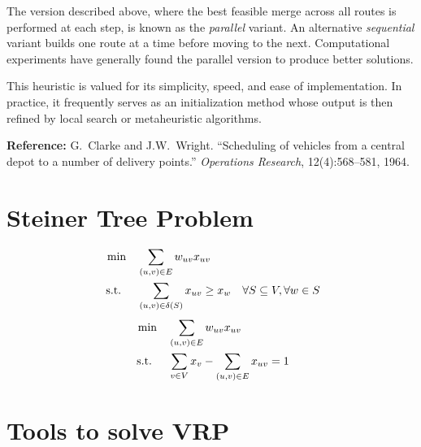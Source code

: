 The version described above, where the best feasible merge across all routes is performed at each step, is known as the \emph{parallel} variant.  An alternative \emph{sequential} variant builds one route at a time before moving to the next.  Computational experiments have generally found the parallel version to produce better solutions.

This heuristic is valued for its simplicity, speed, and ease of implementation.  In practice, it frequently serves as an initialization method whose output is then refined by local search or metaheuristic algorithms.

\medskip
\noindent\textbf{Reference:}  G.~Clarke and J.W.~Wright. ``Scheduling of vehicles from a central depot to a number of delivery points.'' \textit{Operations Research}, 12(4):568--581, 1964.

\section{Steiner Tree Problem}
%
%
\begin{align*}
\min \quad & \sum_{(u,v) \in E} w_{uv} x_{uv}\\
\mbox{ s.t. } \quad  & \sum_{(u,v) \in \delta(S)} x_{uv} \geq x_w & \forall S \subseteq V, \forall w \in S
\end{align*}
%
\begin{align*}
\min \quad & \sum_{(u,v) \in E} w_{uv} x_{uv}\\
\mbox{ s.t. } \quad  & \sum_{v \in V} x_v - \sum_{(u,v) \in E} x_{uv} = 1
\end{align*}
%
%
%
%
%

\section{Tools to solve VRP}

